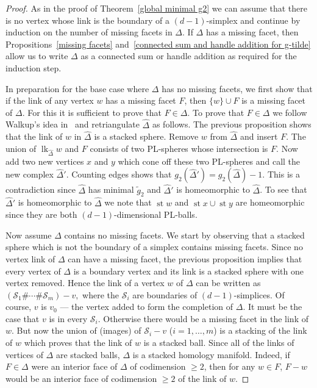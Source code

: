 \documentclass[ALCO,ThmDefs,Unicode,epreuves]{cedram}
\DeclareMathOperator\lk{lk}
\DeclareMathOperator\st{st}
\newcommand{\complet}[1]{\hat{#1}}
\newcommand{\Sm}{{\mathcal S}}
\begin{document}
 \begin{proof}
As in the proof of Theorem~\ref{global minimal g2} we can assume that there is no vertex whose link is the boundary of a $(d-1)$-simplex and continue by induction on the number of missing facets in $\Delta.$ If $\Delta$ has a missing facet, then Propositions~\ref{missing facets} and~\ref{connected sum and handle addition for g-tilde} allow us to write $\Delta$ as a connected sum or handle addition as required for the induction step. 
 
 In preparation for the base case where $\Delta$ has no missing facets, we first show that if the link of any vertex $w$ has a missing facet $F$, then $\{w\} \cup F$ is a missing facet of $\Delta.$ For this it is sufficient to prove that $F \in \Delta.$ To prove that $F \in \Delta$ we follow Walkup's idea in~\cite{Walkup-70} and retriangulate $\complet{\Delta}$ as follows. The previous proposition shows that the link of $w$ in $\complet{\Delta}$ is a stacked sphere. Remove $w$ from $\complet{\Delta}$ and insert $F.$ The union of $\lk_{\complet{\Delta}} w$ and $F$ consists of two PL-spheres whose intersection is $F.$ Now add two new vertices $x$ and $y$ which cone off these two PL-spheres and call the new complex $\complet{\Delta}'.$ Counting edges shows that $g_2(\complet{\Delta}') = g_2(\complet{\Delta}) -1.$ This is a contradiction since $\complet{\Delta}$ has minimal $\tilde{g}_2$ and $\complet{\Delta}'$ is homeomorphic to $\complet{\Delta}$.
To see that $\complet{\Delta}'$ is homeomorphic to $\complet{\Delta}$ we note that $\st w$ and $\st x \cup \st y$ are homeomorphic since they are both $(d-1)$-dimensional PL-balls. 
 

Now assume $\Delta$ contains no missing facets. We start by observing that a stacked sphere which is not the boundary of a simplex contains missing facets. Since no vertex link of $\Delta$ can have a missing facet, the previous proposition implies that every vertex of $\Delta$ is a boundary vertex and its link is a stacked sphere with one vertex removed. Hence the link of a vertex $w$ of $\Delta$ can be written as $(\Sm_1 \# \cdots \# \Sm_m) - v,$ where the $\Sm_i$ are boundaries of $(d-1)$-simplices. Of course, $v$ is $v_0$ --- the vertex added to form the completion of $\Delta.$ 
It must be the case that $v$ is in every $\Sm_i.$ Otherwise there would be a missing facet in the link of $w$. But now the union of (images) of $\Sm_i-v$ ($i=1,\ldots,m$) is a stacking of the link of $w$ which proves that the link of $w$ is a stacked ball. Since all of the links of vertices of $\Delta$ are stacked balls, $\Delta$ is a stacked homology manifold. Indeed, if $F\in\Delta$ were an interior face of $\Delta$ of codimension $\geq 2$, then for any $w\in F$, $F-w$ would be an interior face of codimension $\geq 2$ of the link of $w$. 
 \end{proof}
 
\end{document}
